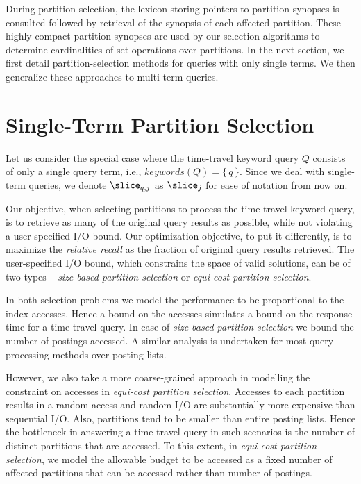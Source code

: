 During partition selection, the lexicon storing pointers to partition synopses is consulted followed by retrieval of the synopsis of each affected partition. These highly compact partition synopses are used by our selection algorithms to determine cardinalities of set operations over partitions. In the next section, we first detail partition-selection methods for queries with only single terms. We then generalize these approaches to multi-term queries.

\section{Single-Term Partition Selection}
\label{sec:singleterm-selection}

Let us consider the special case where the time-travel keyword query
$Q$ consists of only a single query term, i.e., $keywords(Q) =
\{\,q\,\}$. Since we deal with single-term queries, we denote $\slice_{q,j}$ as $\slice_{j}$ for ease of notation from now on. 

Our objective, when selecting partitions to process the
time-travel keyword query, is to retrieve as many of the original query
results as possible, while not violating a user-specified I/O
bound. Our optimization objective, to put it differently, is to
maximize the \textit{relative recall} as the fraction of original query
results retrieved. The user-specified I/O bound, which constrains the
space of valid solutions, can be of two types -- \textit{size-based partition selection} or \textit{equi-cost partition selection}. 

In both selection problems we model the performance to be proportional to the index accesses. Hence a bound on the accesses simulates a bound on the response time for a time-travel query. In case of \textit{size-based partition selection} we bound the number of postings accessed. A similar analysis is undertaken for most query-processing methods over posting lists.

However, we also take a more coarse-grained approach in modelling the constraint on accesses in \textit{equi-cost partition selection}. Accesses to each partition results in a random access and random I/O are substantially more expensive than sequential I/O. Also, partitions tend to be smaller than entire posting lists. Hence the bottleneck in answering a time-travel query in such scenarios is the number of distinct partitions that are accessed. To this extent, in \textit{equi-cost partition selection}, we model the allowable budget to be accessed as a fixed number of affected partitions that can be accessed rather than number of postings.

